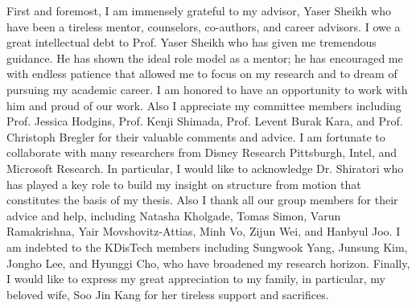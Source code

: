 \begin{acknowledgements}
First and foremost, I am immensely grateful to my advisor, Yaser Sheikh who have been a tireless mentor, counselors, co-authors, and career
advisors. I owe a great intellectual debt to Prof. Yaser Sheikh who has given me tremendous guidance. He has shown the ideal role model as a mentor; he has encouraged me with endless patience that allowed me to focus on my research and to dream of pursuing my academic career. I am honored to have an opportunity to work with him and proud of our work. Also I appreciate my committee members including Prof. Jessica Hodgins, Prof. Kenji Shimada, Prof. Levent Burak Kara, and Prof. Christoph Bregler for their valuable comments and advice. I am fortunate to collaborate with many researchers from Disney Research Pittsburgh, Intel, and Microsoft Research. In particular, I would like to acknowledge Dr. Shiratori who has played a key role to build my insight on structure from motion that constitutes the basis of my thesis. Also I thank all our group members for their advice and help, including Natasha Kholgade, Tomas Simon, Varun Ramakrishna, Yair Movshovitz-Attias, Minh Vo, Zijun Wei, and Hanbyul Joo. I am indebted to the KDisTech members including Sungwook Yang, Junsung Kim, Jongho Lee, and Hyunggi Cho, who have broadened my research horizon. Finally, I would like to express my great appreciation to my family, in particular, my beloved wife, Soo Jin Kang for her tireless support and sacrifices.

\end{acknowledgements}